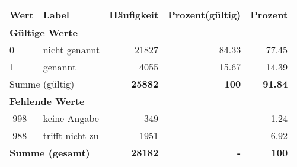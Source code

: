      \begin{longtable}{lXrrr}
     \toprule
     \textbf{Wert} & \textbf{Label} & \textbf{Häufigkeit} & \textbf{Prozent(gültig)} & \textbf{Prozent} \\
     \endhead
     \midrule
     \multicolumn{5}{l}{\textbf{Gültige Werte}}\\

     0 &
     \multicolumn{1}{X}{ nicht genannt   } &


       \num{21827} &
       \num[round-mode=places,round-precision=2]{84,33} &
         \num[round-mode=places,round-precision=2]{77,45} \\

     1 &
     \multicolumn{1}{X}{ genannt   } &


       \num{4055} &
       \num[round-mode=places,round-precision=2]{15,67} &
         \num[round-mode=places,round-precision=2]{14,39} \\
     \midrule
     \multicolumn{2}{l}{Summe (gültig)} &
       \textbf{\num{25882}} &
     \textbf{100} &
       \textbf{\num[round-mode=places,round-precision=2]{91,84}} \\
     \multicolumn{5}{l}{\textbf{Fehlende Werte}}\\
       -998 &
       keine Angabe &
         \num{349} &
        - &
         \num[round-mode=places,round-precision=2]{1,24} \\
       -988 &
       trifft nicht zu &
         \num{1951} &
        - &
         \num[round-mode=places,round-precision=2]{6,92} \\
     \midrule
     \multicolumn{2}{l}{\textbf{Summe (gesamt)}} &
          \textbf{\num{28182}} &
        \textbf{-} &
        \textbf{100} \\
     \bottomrule
     \end{longtable}
     

